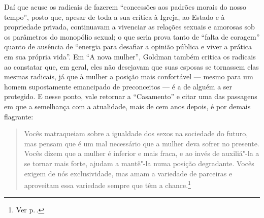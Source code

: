 {Daí que acuse
os radicais de fazerem ``concessões aos padrões morais do nosso tempo'',
posto que, apesar de toda a sua crítica à Igreja, ao Estado e à
propriedade privada, continuavam a vivenciar as relações sexuais e
amorosas sob os parâmetros do monopólio sexual; o que seria prova tanto
de ``falta de coragem'' quanto de ausência de ``energia para desafiar a
opinião pública e viver a prática em sua própria vida''. Em ``A nova
mulher'', Goldman também critica os radicais ao constatar que, em geral,
eles não desejavam que suas esposas se tornassem elas mesmas radicais,
já que à mulher a posição mais confortável --- mesmo para um homem
supostamente emancipado de preconceitos --- é a de alguém a ser
protegido. E nesse ponto, vale retornar a ``Casamento'' e
citar uma das passagens em que a semelhança com a atualidade, mais de
cem anos depois, é por demais flagrante:

\begin{quote}
Vocês matraqueiam sobre a igualdade dos sexos na sociedade do futuro, mas
pensam que é um mal necessário que a mulher deva sofrer no presente.
Vocês dizem que a mulher é inferior e mais fraca, e ao invés de
auxiliá"-la a se tornar mais forte, ajudam a mantê"-la numa posição
degradante. Vocês exigem de nós exclusividade, mas amam a variedade de
parceiras e aproveitam essa variedade sempre que têm a chance.\footnote{Ver p.\,\pageref{matraqueiam}.}
\end{quote}

}
